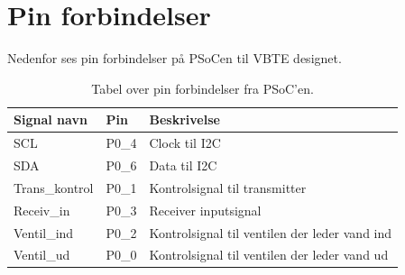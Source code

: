 \section{Pin forbindelser}
Nedenfor ses pin forbindelser på PSoCen til VBTE designet.
\begin{table}[H]
\begin{tabular}{|p{3cm}|p{2cm}|p{8.5cm}|} \hline
\cellcolor[gray]{0.85}Signal navn& \cellcolor[gray]{0.85}Pin &\cellcolor[gray]{0.85}\cellcolor[gray]{0.85}Beskrivelse\\ \hline
SCL & P0\_4 & Clock til I2C \\ \hline
SDA & P0\_6 & Data til I2C \\ \hline
Trans\_kontrol & P0\_1 & Kontrolsignal til transmitter\\ \hline
Receiv\_in & P0\_3 & Receiver inputsignal\\ \hline
Ventil\_ind & P0\_2 & Kontrolsignal til ventilen der leder vand ind\\ \hline
Ventil\_ud & P0\_0 & Kontrolsignal til ventilen der leder vand ud\\ \hline

\end{tabular}
\caption{Tabel over pin forbindelser fra PSoC'en.}
\label{table:VBTEpinforbindelser}
\end{table}